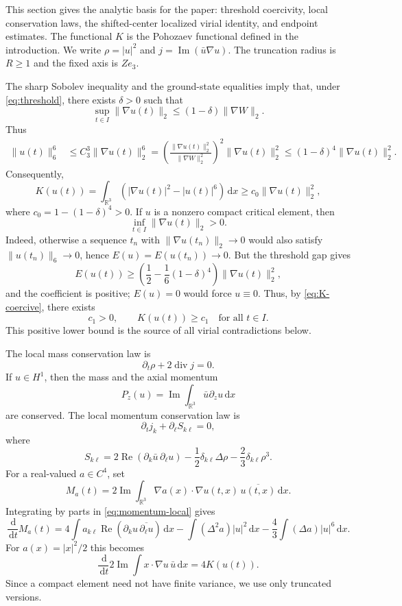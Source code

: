 \documentclass[preprint,12pt]{elsarticle}
\numberwithin{equation}{section}
\newcommand{\R}{\mathbb R}
\newcommand{\dd}{\,\mathrm d}
\newcommand{\na}{\nabla}
\newcommand{\pa}{\partial}
\newcommand{\ez}{e_3}
\newcommand{\Ima}{\operatorname{Im}}
\newcommand{\Rea}{\operatorname{Re}}
\theoremstyle{remark}
\begin{document}
This section gives the analytic basis for the paper: threshold coercivity, local conservation laws, the shifted-center localized virial identity, and endpoint estimates.  The functional $K$ is the Pohozaev functional defined in the introduction.  We write $\rho=|u|^2$ and $j=\Ima(\bar u\na u)$.  The truncation radius is $R\ge1$ and the fixed axis is $Z\ez$.

The sharp Sobolev inequality and the ground-state equalities imply that, under \eqref{eq:threshold}, there exists $\delta>0$ such that
\begin{equation}\label{eq:gradient-gap}
  \sup_{t\in I}\|\na u(t)\|_2\le (1-\delta)\|\na W\|_2.
\end{equation}
Thus
\begin{align*}
  \|u(t)\|_6^6
  &\le C_3^3\|\na u(t)\|_2^6
  =\left(\frac{\|\na u(t)\|_2^2}{\|\na W\|_2^2}\right)^2\|\na u(t)\|_2^2
  \le (1-\delta)^4\|\na u(t)\|_2^2.
\end{align*}
Consequently,
\begin{equation}\label{eq:K-coercive}
  K(u(t))=\int_{\R^3}(|\na u(t)|^2-|u(t)|^6)\dd x
  \ge c_0\|\na u(t)\|_2^2,
\end{equation}
where $c_0=1-(1-\delta)^4>0$.  If $u$ is a nonzero compact critical element, then
\[
  \inf_{t\in I}\|\na u(t)\|_2>0.
\]
Indeed, otherwise a sequence $t_n$ with $\|\na u(t_n)\|_2\to0$ would also satisfy $\|u(t_n)\|_6\to0$, hence $E(u)=E(u(t_n))\to0$.  But the threshold gap gives
\[
  E(u(t))\ge\left(\frac12-\frac16(1-\delta)^4\right)\|\na u(t)\|_2^2,
\]
and the coefficient is positive; $E(u)=0$ would force $u\equiv0$.  Thus, by \eqref{eq:K-coercive}, there exists
\begin{equation}\label{eq:c1-positive}
  c_1>0,
  \qquad K(u(t))\ge c_1\quad\text{for all }t\in I.
\end{equation}
This positive lower bound is the source of all virial contradictions below.

The local mass conservation law is
\begin{equation}\label{eq:mass-local}
  \pa_t\rho+2\operatorname{div}j=0.
\end{equation}
If $u\in H^1$, then the mass and the axial momentum
\[
  P_z(u)=\Ima\int_{\R^3}\bar u\pa_z u\dd x
\]
are conserved.  The local momentum conservation law is
\begin{equation}\label{eq:momentum-local}
  \pa_t j_k+\pa_\ell S_{k\ell}=0,
\end{equation}
where
\[
  S_{k\ell}=2\Rea(\pa_k\bar u\,\pa_\ell u)-\frac12\delta_{k\ell}\Delta\rho-
  \frac23\delta_{k\ell}\rho^3.
\]
For a real-valued $a\in C^4$, set
\[
  M_a(t)=2\Ima\int_{\R^3}\na a(x)\cdot\na u(t,x)\,\overline{u(t,x)}\dd x.
\]
Integrating by parts in \eqref{eq:momentum-local} gives
\begin{equation}\label{eq:local-virial-general}
  \frac{\dd}{\dd t}M_a(t)
  =4\int a_{k\ell}\Rea(\pa_k u\,\overline{\pa_\ell u})\dd x
  -\int (\Delta^2a)|u|^2\dd x
  -\frac43\int(\Delta a)|u|^6\dd x.
\end{equation}
For $a(x)=|x|^2/2$ this becomes
\[
  \frac{\dd}{\dd t}2\Ima\int x\cdot\na u\,\bar u\dd x=4K(u(t)).
\]
Since a compact element need not have finite variance, we use only truncated versions.
\end{document}
